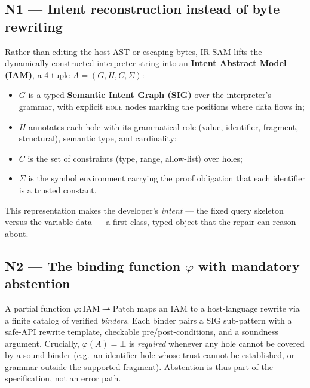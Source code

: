 \documentclass[11pt,a4paper]{article}
\newcommand{\bottom}{\ensuremath{\bot}}
\newcommand{\irsam}{\mbox{IR\nobreakdash-SAM}}
\begin{document}
\subsection{N1 --- Intent reconstruction instead of byte rewriting}
Rather than editing the host AST or escaping bytes, \irsam{} lifts the
dynamically constructed interpreter string into an \textbf{Intent
Abstract Model (IAM)}, a 4-tuple $A=(G,H,C,\Sigma)$:
\begin{itemize}[leftmargin=1.4em,nosep]
  \item $G$ is a typed \textbf{Semantic Intent Graph (SIG)} over the
  interpreter's grammar, with explicit \textsc{hole} nodes marking the
  positions where data flows in;
  \item $H$ annotates each hole with its grammatical role
  (\textsf{value}, \textsf{identifier}, \textsf{fragment},
  \textsf{structural}), semantic type, and cardinality;
  \item $C$ is the set of constraints (type, range, allow-list) over
  holes;
  \item $\Sigma$ is the symbol environment carrying the proof obligation
  that each identifier is a trusted constant.
\end{itemize}
This representation makes the developer's \emph{intent} --- the fixed
query skeleton versus the variable data --- a first-class, typed object
that the repair can reason about.

\subsection{N2 --- The binding function \texorpdfstring{$\varphi$}{phi}
with mandatory abstention}
A partial function $\varphi:\mathrm{IAM}\rightharpoonup\mathrm{Patch}$
maps an IAM to a host-language rewrite via a finite catalog of verified
\emph{binders}. Each binder pairs a SIG sub-pattern with a safe-API
rewrite template, checkable pre/post-conditions, and a soundness
argument. Crucially, $\varphi(A)=\bottom$ is \emph{required} whenever any
hole cannot be covered by a sound binder (e.g.\ an identifier hole whose
trust cannot be established, or grammar outside the supported fragment).
Abstention is thus part of the specification, not an error path.
\end{document}
